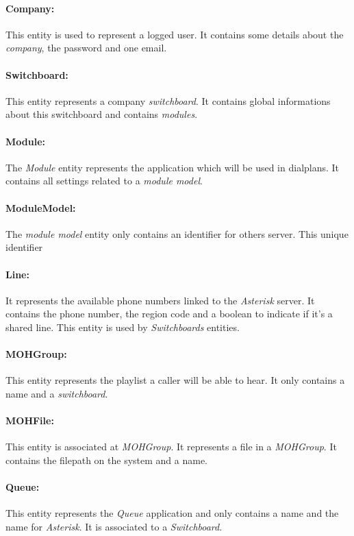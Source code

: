 \paragraph{Company:} 
This entity is used to represent a logged user. It contains some details about the \textit{company}, the password and one email.
 
\paragraph{Switchboard:}
This entity represents a company \textit{switchboard}. It contains global informations about this switchboard and contains \textit{modules}. 

\paragraph{Module:}
The \textit{Module} entity represents the application which will be used in dialplans. It contains all settings related to a \textit{module model}. 

\paragraph{ModuleModel:}
The \textit{module model} entity only contains an identifier for others server. This unique identifier 

\paragraph{Line:}
It represents the available phone numbers linked to the \textit{Asterisk} server. It contains the phone number, the region code and a boolean to indicate if it's a shared line. This entity is used by \textit{Switchboards} entities.

\paragraph{MOHGroup:}
This entity represents the playlist a caller will be able to hear. It only contains a name and a \textit{switchboard}.

\paragraph{MOHFile:}
This entity is associated at \textit{MOHGroup}. It represents a file in a \textit{MOHGroup}. It contains the filepath on the system and a name.

\paragraph{Queue:}
This entity represents the \textit{Queue} application and only contains a name and the name for \textit{Asterisk}. It is associated to a \textit{Switchboard}.

